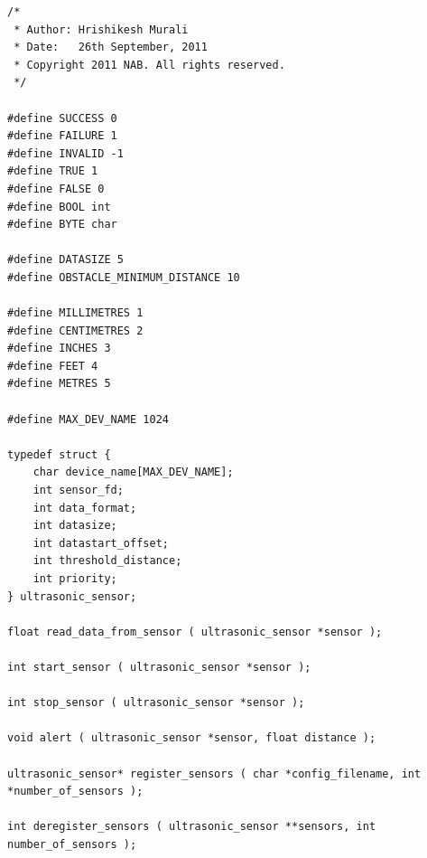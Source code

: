 \documentclass[12pt]{article}
\begin{document}
\begin{lstlisting}[caption="obstacledetect.h - Obstacle Detection headers"]
/* 
 * Author: Hrishikesh Murali 
 * Date:   26th September, 2011
 * Copyright 2011 NAB. All rights reserved. 
 */ 

#define SUCCESS 0 
#define FAILURE 1 
#define INVALID -1 
#define TRUE 1 
#define FALSE 0 
#define BOOL int 
#define BYTE char 

#define DATASIZE 5 
#define OBSTACLE_MINIMUM_DISTANCE 10 

#define MILLIMETRES 1 
#define CENTIMETRES 2 
#define INCHES 3 
#define FEET 4 
#define METRES 5 

#define MAX_DEV_NAME 1024 

typedef struct { 
	char device_name[MAX_DEV_NAME]; 
	int sensor_fd; 
	int data_format; 
	int datasize; 
	int datastart_offset; 
	int threshold_distance; 
	int priority; 
} ultrasonic_sensor; 

float read_data_from_sensor ( ultrasonic_sensor *sensor ); 

int start_sensor ( ultrasonic_sensor *sensor ); 

int stop_sensor ( ultrasonic_sensor *sensor ); 

void alert ( ultrasonic_sensor *sensor, float distance ); 

ultrasonic_sensor* register_sensors ( char *config_filename, int *number_of_sensors ); 

int deregister_sensors ( ultrasonic_sensor **sensors, int number_of_sensors );

\end{lstlisting}
\end{document}
